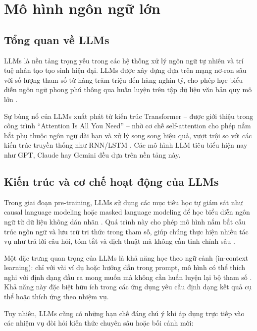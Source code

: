 \section{Mô hình ngôn ngữ lớn}

\subsection{Tổng quan về LLMs}
LLMs là nền tảng trọng yếu trong các hệ thống xử lý ngôn ngữ tự nhiên và trí tuệ nhân tạo tạo sinh hiện đại. LLMs được xây dựng dựa trên mạng nơ-ron sâu với số lượng tham số từ hàng trăm triệu đến hàng nghìn tỷ, cho phép học biểu diễn ngôn ngữ phong phú thông qua huấn luyện trên tập dữ liệu văn bản quy mô lớn \cite{knollmeyer2025document}.  

Sự bùng nổ của LLMs xuất phát từ kiến trúc Transformer – được giới thiệu trong công trình “Attention Is All You Need” – nhờ cơ chế self-attention cho phép nắm bắt phụ thuộc ngôn ngữ dài hạn và xử lý song song hiệu quả, vượt trội so với các kiến trúc truyền thống như RNN/LSTM \cite{vaswani2017attention, knollmeyer2025document}. Các mô hình LLM tiêu biểu hiện nay như GPT, Claude hay Gemini đều dựa trên nền tảng này.

\subsection{Kiến trúc và cơ chế hoạt động của LLMs}
Trong giai đoạn pre-training, LLMs sử dụng các mục tiêu học tự giám sát như causal language modeling hoặc masked language modeling để học biểu diễn ngôn ngữ từ dữ liệu không dán nhãn \cite{devlin2019bert, brown2020language}. Quá trình này cho phép mô hình nắm bắt cấu trúc ngôn ngữ và lưu trữ tri thức trong tham số, giúp chúng thực hiện nhiều tác vụ như trả lời câu hỏi, tóm tắt và dịch thuật mà không cần tinh chỉnh sâu \cite{bommasani2021opportunities}.

Một đặc trưng quan trọng của LLMs là khả năng học theo ngữ cảnh (in-context learning): chỉ với vài ví dụ hoặc hướng dẫn trong prompt, mô hình có thể thích nghi với định dạng đầu ra mong muốn mà không cần huấn luyện lại bộ tham số \cite{brown2020language}. Khả năng này đặc biệt hữu ích trong các ứng dụng yêu cầu định dạng kết quả cụ thể hoặc thích ứng theo nhiệm vụ.

Tuy nhiên, LLMs cũng có những hạn chế đáng chú ý khi áp dụng trực tiếp vào các nhiệm vụ đòi hỏi kiến thức chuyên sâu hoặc bối cảnh mới:

